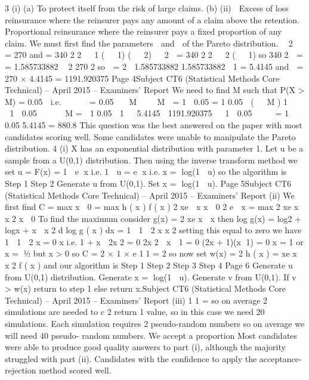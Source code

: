 3
(i)
(a)
To protect itself from the risk of large claims.
(b)
(ii)
 Excess of loss reinsurance where the reinsurer pays any amount of
a claim above the retention.
 Proportional reinsurance where the reinsurer pays a fixed
proportion of any claim.
We must first find the parameters  and  of the Pareto distribution.
 2

= 270 and
= 340 2
2
  1
(   1) (   2)

 2

= 340 2
2
  2 (   1)
so
340 2

=
= 1.585733882
 2
270 2
so  =
2  1.585733882
1.585733882  1
= 5.4145
and  = 270 × 4.4145 = 1191.920375
Page 4Subject CT6 (Statistical Methods Core Technical) – April 2015 – Examiners’ Report
We need to find M such that P(X > M) = 0.05

i.e.
  

 = 0.05
  M 

 M

= 1

0.05
= 1
0.05  (   M )
1 

  1  0.05  



M = 
1
0.05 
1 

5.4145

1191.920375   1  0.05




=
1
0.05 5.4145
= 880.8
This question was the best answered on the paper with most candidates scoring well. Some
candidates were unable to manipulate the Pareto distribution.
4
(i)
X has an exponential distribution with parameter 1.
Let u be a sample from a U(0,1) distribution.
Then using the inverse transform method we set
u = F(x) = 1  e x
i.e. 1  u = e x
i.e. x = log(1  u)
so the algorithm is
Step 1
Step 2
Generate u from U(0,1).
Set x = log(1  u).
Page 5Subject CT6 (Statistical Methods Core Technical) – April 2015 – Examiners’ Report
(ii)
We first find C = max
x  0
= max
h ( x )
f ( x )
2 xe  x
x  0
2
e  x
= max 2 xe x  x
2
x  0
To find the maximum consider g(x) = 2 xe x  x
then
log g(x) = log2 + logx + x  x 2
d log g ( x )
dx = 1  1  2 x
x
2
setting this equal to zero we have
1
 1  2 x = 0
x
i.e.
1 + x  2x 2 = 0
2x 2  x  1 = 0
(2x + 1)(x 1) = 0
x = 1 or x = 1⁄2
but x > 0 so C = 2 × 1 × e 11 = 2
so now set w(x) =
2
h ( x )
= xe x  x
2 f ( x )
and our algorithm is
Step 1
Step 2
Step 3
Step 4
Page 6
Generate u from U(0,1) distribution.
Generate x = log(1  u).
Generate v from U(0,1).
If v > w(x) return to step 1 else return x.Subject CT6 (Statistical Methods Core Technical) – April 2015 – Examiners’ Report
(iii)
1
1
=
so on average 2 simulations are needed to
c
2
return 1 value, so in this case we need 20 simulations. Each simulation
requires 2 pseudo-random numbers so on average we will need 40 pseudo-
random numbers.
We accept a proportion
Most candidates were able to produce good quality answers to part (i), although the majority
struggled with part (ii). Candidates with the confidence to apply the acceptance-rejection
method scored well.
